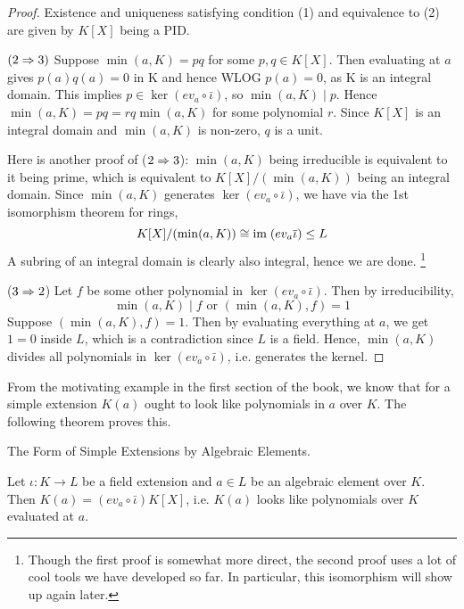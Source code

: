 \documentclass[../book.tex]{subfiles}
\begin{document}
\begin{proof}
    Existence and uniqueness satisfying condition (1) and equivalence to (2) 
    are given by $K[X]$ being a PID. 
    
    $(2 \Rightarrow 3)$
    Suppose $\min(a,K)=pq$ for some $p,q \in K[X]$.
    Then evaluating at $a$ gives $p(a)q(a)=0$ in K and hence WLOG $p(a)=0$,
    as K is an integral domain.
    This implies $p \in \ker(ev_a \circ \bar\iota)$, so $\min(a,K) \mid p$.
    Hence $\min(a,K) = pq = rq \min(a,K)$ for some polynomial $r$.
    Since $K[X]$ is an integral domain and $\min(a,K)$ is non-zero, $q$ is a unit.
    
    Here is another proof of ($2 \Rightarrow 3$):
    $\min(a,K)$ being irreducible is equivalent to it being prime,
    which is equivalent to $K[X]/(\min(a,K))$ being an integral domain.
    Since $\min(a,K)$ generates $\ker(ev_a \circ \bar\iota)$, 
    we have via the 1st isomorphism theorem for rings, \[
        K[X]/(\min(a,K)) \cong \textnormal{im}\; (ev_a \overline{\iota}) \leq L
    \]
    A subring of an integral domain is clearly also integral, hence we are done.
    \footnote{Though the first proof is somewhat more direct, 
    the second proof uses a lot of cool tools we have developed so far. 
    In particular, this isomorphism will show up again later.}
    
    ($3 \Rightarrow 2$)
    Let $f$ be some other polynomial in $\ker(ev_a \circ\bar\iota)$.
    Then by irreducibility, 
    \[\min(a, K) \mid f \text{ or } (\min(a,K),f) = 1\]
    Suppose $(\min(a,K),f) = 1$. 
    Then by evaluating everything at $a$, we get $1 = 0$ inside $L$,
    which is a contradiction since $L$ is a field. 
    Hence, $\min(a,K)$ divides all polynomials in $\ker(ev_a \circ \bar\iota)$,
    i.e. generates the kernel.
\end{proof}
\begin{rmk}
    From the motivating example in the first section of the book, 
    we know that for a simple extension $K(a)$ ought to look like
    polynomials in $a$ over $K$. 
    The following theorem proves this.
\end{rmk}
\begin{thm} The Form of Simple Extensions by Algebraic Elements.

    Let $\iota : K \to L$ be a field extension and 
    $a \in L$ be an algebraic element over $K$. 
    Then $K(a) = (ev_a \circ\bar\iota)K[X]$,
    i.e. $K(a)$ looks like polynomials over $K$ evaluated at $a$.
\end{thm}
\end{document}

